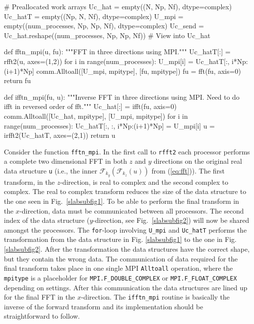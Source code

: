 \documentclass[11pt, oneside]{article}
\newcommand{\inpyth}{\lstinline[style=pythonstyle, basicstyle=\ttfamily]} %[]%
\begin{document}
\begin{python}
# Preallocated work arrays
Uc_hat  = empty((N, Np, Nf), dtype=complex) 
Uc_hatT = empty((Np, N, Nf), dtype=complex) 
U_mpi   = empty((num_processes, Np, Np, Nf), dtype=complex)
Uc_send = Uc_hat.reshape((num_processes, Np, Np, Nf)) # View into Uc_hat

def fftn_mpi(u, fu):
    """FFT in three directions using MPI."""
    Uc_hatT[:] = rfft2(u, axes=(1,2))
    for i in range(num_processes): 
        U_mpi[i] = Uc_hatT[:, i*Np:(i+1)*Np]
    comm.Alltoall([U_mpi, mpitype], [fu, mpitype])    
    fu = fft(fu, axis=0)
    return fu

def ifftn_mpi(fu, u):
    """Inverse FFT in three directions using MPI.
       Need to do ifft in reversed order of fft."""
    Uc_hat[:] = ifft(fu, axis=0)
    comm.Alltoall([Uc_hat, mpitype], [U_mpi, mpitype])
    for i in range(num_processes):
        Uc_hatT[:, :, i*Np:(i+1)*Np] = U_mpi[i]
    u = irfft2(Uc_hatT, axes=(2,1))
    return u
\end{python}
Consider the function \inpyth{fftn_mpi}. In the first call to \inpyth{rfft2} each processor performs a
complete two dimensional FFT in both $z$ and $y$ directions on the original real data structure \inpyth{u}
(i.e., the inner $\mathcal{F}_{k_y}(\mathcal{F}_{k_z}(u))$ from (\ref{eq:fft})). 
The first transform, in the $z$-direction, is real to complex and the second complex to complex. The real
to complex transform reduces the size of the data structure to the one seen in Fig.~\ref{slabsubfig1}. 
To be able to perform the final transform in the $x$-direction, data must be communicated between all
processors. The second index of the data structure ($y$-direction, see Fig.~\ref{slabsubfig2}) will now be 
shared amongst the processors. The \inpyth{for}-loop involving \inpyth{U_mpi} and \inpyth{Uc_hatT} performs 
the transformation from the data structure in Fig. \ref{slabsubfig1} to the one in Fig. \ref{slabsubfig2}. 
After the transformation the data structures have the correct shape, but they contain the wrong data. The 
communication of data required for the final transform takes place in one single MPI \inpyth{Alltoall} 
operation, where the \inpyth{mpitype} is a placeholder for \inpyth{MPI.F_DOUBLE_COMPLEX} or 
\inpyth{MPI.F_FLOAT_COMPLEX} depending on settings. After this communication the data structures are lined 
up for the final FFT in the $x$-direction. The \inpyth{ifftn_mpi} routine is basically the inverse of the 
forward transform and its implementation should be straightforward to follow.
\end{document}
